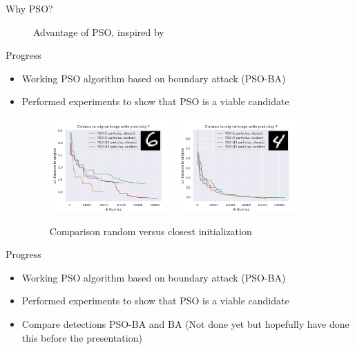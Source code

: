 \documentclass[11pt,t]{beamer}
\begin{document}
\begin{frame}{Why PSO?}
\begin{figure}
{\begin{tikzpicture}[x=0.75pt,y=0.75pt,yscale=-1,xscale=1]
\end{tikzpicture}
}
\caption{Advantage of PSO, inspired by \cite{brendel2018decisionbased}}
\label{fig:pso_advantage}
\end{figure}
\end{frame}

\begin{frame}[plain]{Progress}
\begin{itemize}
	\item Working PSO algorithm based on boundary attack (PSO-BA)
	\item Performed experiments to show that PSO is a viable candidate
	\begin{figure}
	\centering
	\includegraphics[width=0.45\textwidth]{graphics/random_vs_closest.png}
	\includegraphics[width=0.45\textwidth]{graphics/random_vs_closest_1.png}
	\caption{Comparison random versus closest initialization\label{fig:rand_vs_close}}
	\footnotesize
	\flushleft
	\end{figure}
\end{itemize}
\end{frame}

\begin{frame}{Progress}
\begin{itemize}
	\item Working PSO algorithm based on boundary attack (PSO-BA)
	\item Performed experiments to show that PSO is a viable candidate
	\item Compare detections PSO-BA and BA (Not done yet but hopefully have done this before the presentation)
\end{itemize}
\end{frame}
\end{document}
